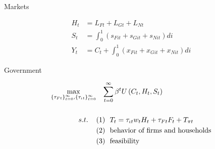 \documentclass[11pt,aspectratio=169]{beamer}
\begin{document}
		
		
		\begin{frame}{Markets}
			\begin{minipage}[t!]{1\textwidth}
				\begin{align*}
					H_{t}&=L_{Ft}+L_{Gt}+L_{Nt}\\
					S_{t}& = \int_{0}^{1}\left(s_{Fit}+s_{Git}+s_{Nit}\right)di\\
					Y_t&=C_t+\int_{0}^{1}\left(x_{Fit}+x_{Git}+x_{Nit}\right)di
				\end{align*}
			\end{minipage}
		\end{frame}
		
		
		
		
		\begin{frame}{ Government}
			\hypertarget{gov}{}
			\vspace{-4mm}
			\centering
			\begin{minipage}[t!]{1\textwidth}
				\begin{align*}
					\max_{\{\tau_{Ft}\}_{t=0}^{\infty}, \{\tau_{\iota t}\}_{t=0}^{\infty}}&\hspace{3mm} \sum_{t=0}^{\infty}\beta^t U\left(C_t,H_t, S_t\right)\\ \ \\
					{s.t.} \hspace{4mm}
					&{ (1)\ \ T_t=\tau_{\iota t}w_{t}H_{t}+{{\tau_{Ft}}}F_{t}}+T_{\pi t}\\
					& {(2)\ \  \text{behavior of firms and households}}\\
					& {(3)\ \ \text{feasibility} }\\
					& \ %
				\end{align*}
			\end{minipage}
			

\end{frame}
\end{document}
